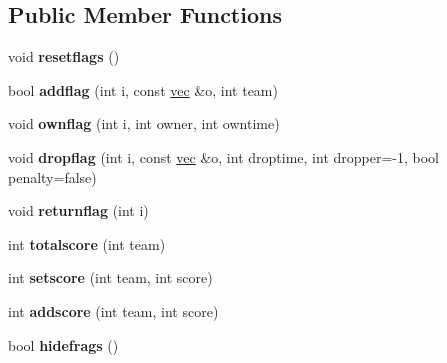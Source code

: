 \subsection*{Public Member Functions}
\begin{DoxyCompactItemize}
\item 
\mbox{\label{structserver_1_1ctfservmode_abb48efb6b5dd5e20d487f0828f8ed311}} 
void {\bfseries resetflags} ()
\item 
\mbox{\label{structserver_1_1ctfservmode_a1d73a0c7460d2d74788e7867e4a38301}} 
bool {\bfseries addflag} (int i, const \hyperlink{structvec}{vec} \&o, int team)
\item 
\mbox{\label{structserver_1_1ctfservmode_a5bbf56cb81f3727efbdfe59c2d86e971}} 
void {\bfseries ownflag} (int i, int owner, int owntime)
\item 
\mbox{\label{structserver_1_1ctfservmode_adaf6e4bbfa047ae3d83f20377286a03a}} 
void {\bfseries dropflag} (int i, const \hyperlink{structvec}{vec} \&o, int droptime, int dropper=-\/1, bool penalty=false)
\item 
\mbox{\label{structserver_1_1ctfservmode_a445e1d4be77b7b01bc6535c78a8276ec}} 
void {\bfseries returnflag} (int i)
\item 
\mbox{\label{structserver_1_1ctfservmode_a39003e9b247deb2b0a26dce9d65717ff}} 
int {\bfseries totalscore} (int team)
\item 
\mbox{\label{structserver_1_1ctfservmode_a77cffdac6b3f78827ebd6e897a29f07b}} 
int {\bfseries setscore} (int team, int score)
\item 
\mbox{\label{structserver_1_1ctfservmode_a1e70feb67367d6bd4a9f6176e582de32}} 
int {\bfseries addscore} (int team, int score)
\item 
\mbox{\label{structserver_1_1ctfservmode_a638ef439347a831bf057c3f47b6731c1}} 
bool {\bfseries hidefrags} ()
\item 

\end{DoxyCompactItemize}
